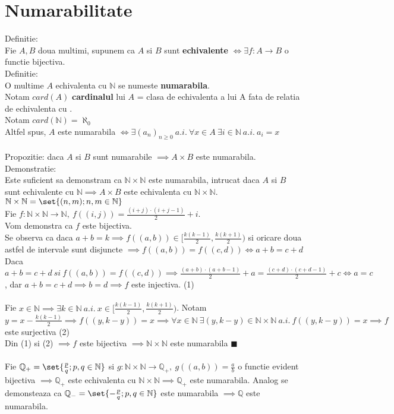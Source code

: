 \documentclass{article}
\newcommand*{\QEDA}{\hfill\ensuremath{\blacksquare}}%
\begin{document}
    \section{Numarabilitate}
        Definitie:\\
        Fie $A,B$ doua multimi, supunem ca $A$ si $B$ sunt \textbf{echivalente} $\iff \exists f:A\rightarrow B$ o functie bijectiva.\\
        Definitie:\\
        O multime $A$ echivalenta cu $\mathbb{N}$ se numeste \textbf{numarabila}.\\
        Notam $card(A)$ \textbf{cardinalul} lui $A$ = clasa de echivalenta a lui A fata de relatia de echivalenta cu .\\
        Notam $card(\mathbb{N})=\aleph_0$\\
        Altfel spus, $A$ este numarabila $\iff \exists (a_n)_{n\geq0}\ a.i.\ \forall x\in A\ \exists i\in \mathbb{N}\ a.i.\ a_i = x$\\ \\
        Propozitie: daca $A$ si $B$ sunt numarabile $\implies A\times B$ este numarabila.\\
        Demonstratie:\\
        Este suficient sa demonstram ca $\mathbb{N} \times \mathbb{N}$ este numarabila, intrucat daca $A$ si $B$ sunt echivalente cu $\mathbb{N} \implies
        A\times B$ este echivalenta cu $\mathbb{N} \times \mathbb{N}$.\\
        $\mathbb{N} \times \mathbb{N} = \set{(n,m);n,m\in\mathbb{N}}$\\
        Fie $f:\mathbb{N} \times \mathbb{N} \rightarrow \mathbb{N},\ f((i,j)) = \frac{(i+j)\cdot(i+j-1)}{2}+i$.\\ Vom demonstra ca $f$ este bijectiva.\\
        Se observa ca daca $a+b=k\implies f((a,b))\in [\frac{k(k-1)}{2},\frac{k(k+1)}{2})$ si oricare doua astfel de intervale sunt disjuncte $\implies f((a,b))=f((c,d)) \iff a+b=c+d$\\
        Daca $a+b=c+d\ si\ f((a,b))=f((c,d)) \implies \frac{(a+b)\cdot(a+b-1)}{2}+a = \frac{(c+d)\cdot(c+d-1)}{2}+c \iff a=c$, dar $a+b=c+d \implies b=d
        \implies f$ este injectiva. \hfill (1)\\\\
        Fie $x \in \mathbb{N} \implies \exists k\in \mathbb{N}\ a.i.\ x\in [\frac{k(k-1)}{2},\frac{k(k+1)}{2})$. Notam $y=x-\frac{k(k-1)}{2} \implies f((y,k-y))=
        x \implies \forall x \in \mathbb{N}\ \exists (y,k-y) \in \mathbb{N} \times \mathbb{N}\ a.i.\ f((y,k-y))=x \implies f$ este surjectiva \hfill (2)\\
        Din (1) si (2) $\implies f$ este bijectiva $\implies \mathbb{N} \times \mathbb{N}$ este numarabila \hfill \QEDA\\ \\
        Fie $\mathbb{Q}_+=\set{\frac{p}{q};p,q\in\mathbb{N}}$ si $g:\mathbb{N} \times \mathbb{N} \rightarrow \mathbb{Q}_+,\ g((a,b))=\frac{a}{b}$ o functie
        evident bijectiva $\implies \mathbb{Q}_+$ este echivalenta cu $\mathbb{N} \times \mathbb{N} \implies \mathbb{Q}_+$ este numarabila. Analog se demonsteaza ca
        $\mathbb{Q}_- =\set{-\frac{p}{q};p,q\in\mathbb{N}}$ este numarabila $\implies \mathbb{Q}$ este numarabila.
\end{document}
